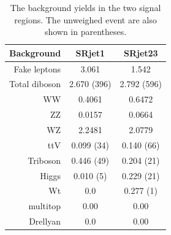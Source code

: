 \begin{table}[htpb]
\centering
\begin{tabular}{|r|c|c|}
\hline
Background & SRjet1 & SRjet23 \\
\hline
\hline
Fake leptons & 3.061 & 1.542\\
\hline
\hline
Total diboson & 2.670 (396) & 2.792 (596)\\
\hline
WW & 0.4061 &  0.6472 \\
ZZ & 0.0157 &  0.0664 \\
WZ & 2.2481 &  2.0779 \\
\hline
\hline
ttV & 0.099 (34) & 0.140 (66)\\
Triboson & 0.446 (49)& 0.204 (21)\\
Higgs & 0.010 (5)& 0.229 (21)\\
Wt & 0.0 & 0.277 (1)\\
multitop & 0.00 & 0.00 \\
Drellyan & 0.0 & 0.00\\
\hline
\end{tabular}
\caption{The background yields in the two signal regions. The unweighed event are also shown in parentheses.}
\label{tab:SR_yields}
\end{table}

